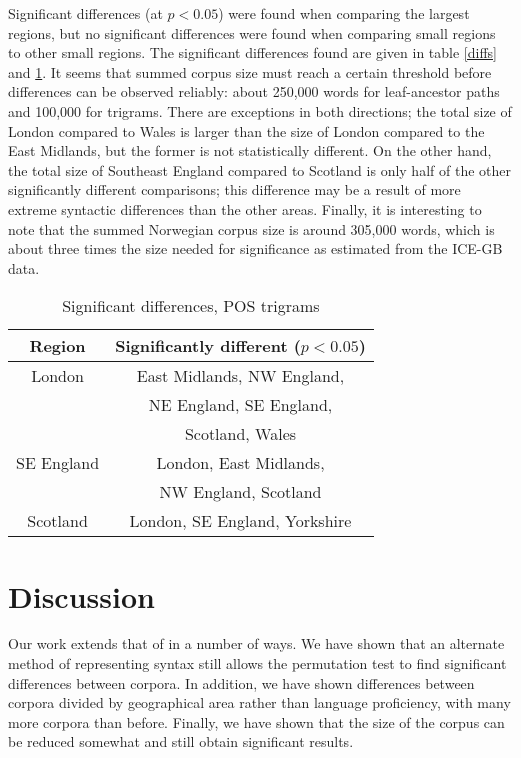\documentclass[11pt,letterpaper]{article}
\begin{document}
Significant differences (at $p < 0.05$) were found when
comparing the largest regions, but no significant differences were
found when comparing small regions to other small regions. The
significant differences found are given in table \ref{diffs} and
\ref{trigramdiffs}. It seems that summed corpus size must reach a
certain threshold before differences can be observed reliably: about 250,000
words for leaf-ancestor paths and 100,000 for trigrams. There are exceptions in
both directions; the total size of London compared to Wales is larger than
the size of  London
compared to the East Midlands, but the former is not statistically different.
On the other hand, the total size of Southeast England compared to
Scotland is only half of the other significantly different comparisons; this
difference may be a result of
more extreme syntactic differences than the other areas.
Finally, it is interesting to note that the summed Norwegian corpus
size is around 305,000 words, which is about three times the size needed
for significance as estimated from the ICE-GB data.

\begin{table}
  \begin{tabular}{|c|c|} \hline %
    Region & Significantly different ($p < 0.05$) \\ \hline
    London & East Midlands, NW England, \\
    & NE England, SE England,\\
    & Scotland, Wales \\ \hline
    SE England & London, East Midlands, \\
    & NW England, Scotland \\ \hline
    Scotland & London, SE England, Yorkshire \\ \hline
  \end{tabular}
  \label{trigramdiffs}
\caption{Significant differences, POS trigrams}
\end{table}

\section{Discussion}

Our work extends that of  in a number of ways. We
have shown that an alternate method of representing syntax still
allows the permutation test to find significant differences between
corpora. In addition, we have shown differences between corpora divided
by geographical area rather than language proficiency, with many more
corpora than before. Finally, we have shown that the size of the
corpus can be reduced somewhat and still obtain significant results.
\end{document}
